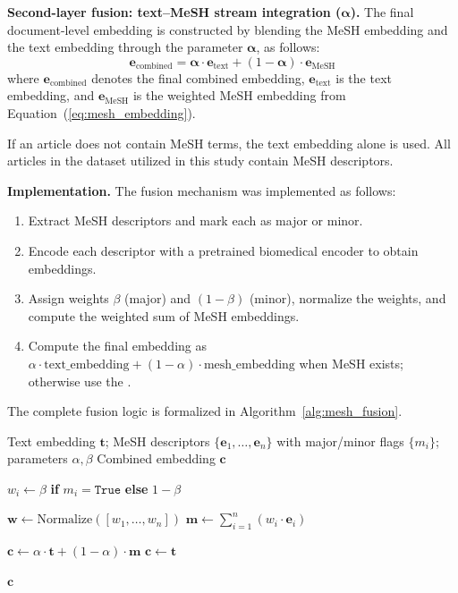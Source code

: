 \documentclass[authorproof,JACIII,researchpaper]{fujipressarticle}
\begin{document}
\noindent\textbf{Second-layer fusion: text--MeSH stream integration ($\boldsymbol{\alpha}$).}
The final document-level embedding is constructed by blending the MeSH embedding and the text embedding through the parameter $\boldsymbol{\alpha}$, as follows:
\begin{equation}
\boldsymbol{e}_{\text{combined}} = \boldsymbol{\alpha} \cdot \boldsymbol{e}_{\text{text}} + (1 - \boldsymbol{\alpha}) \cdot \boldsymbol{e}_{\text{MeSH}}
\label{eq:combined_embedding}
\end{equation}
where $\boldsymbol{e}_{\text{combined}}$ denotes the final combined embedding, $\boldsymbol{e}_{\text{text}}$ is the text embedding, and $\boldsymbol{e}_{\text{MeSH}}$ is the weighted MeSH embedding from Equation~(\ref{eq:mesh_embedding}).

If an article does not contain MeSH terms, the text embedding alone is used.
All articles in the dataset utilized in this study contain MeSH descriptors.

\noindent\textbf{Implementation.}
The fusion mechanism was implemented as follows:
\begin{enumerate}[leftmargin=*,label=\arabic*.]
    \item Extract MeSH descriptors and mark each as major or minor.
    \item Encode each descriptor with a pretrained biomedical encoder to obtain embeddings.
    \item Assign weights $\beta$ (major) and $(1-\beta)$ (minor), normalize the weights, and compute the weighted sum of MeSH embeddings.
    \item Compute the final embedding as $\alpha\cdot\text{text\_embedding} + (1-\alpha)\cdot\text{mesh\_embedding}$ when MeSH exists; otherwise use the .
\end{enumerate}

The complete fusion logic is formalized in Algorithm~\ref{alg:mesh_fusion}.

\begin{algorithm}[H]
\caption{Text--MeSH Fusion with Major/Minor Weights}
\label{alg:mesh_fusion}
\begin{algorithmic}[1]
\Require Text embedding $\boldsymbol{t}$; MeSH descriptors $\{\boldsymbol{e}_1,\ldots,\boldsymbol{e}_n\}$ with major/minor flags $\{m_i\}$; parameters $\alpha,\beta$
\Ensure Combined embedding $\boldsymbol{c}$

    \State $w_i \gets \beta$ \textbf{if} $m_i = \texttt{True}$ \textbf{else} $1-\beta$
\EndFor

\State $\boldsymbol{w} \gets \mathrm{Normalize}([w_1,\ldots,w_n])$
\State $\boldsymbol{m} \gets \sum_{i=1}^{n} (w_i \cdot \boldsymbol{e}_i)$

    \State $\boldsymbol{c} \gets \alpha \cdot \boldsymbol{t} + (1-\alpha) \cdot \boldsymbol{m}$
\Else
    \State $\boldsymbol{c} \gets \boldsymbol{t}$
\EndIf

\State \Return $\boldsymbol{c}$
\end{algorithmic}
\end{algorithm}
\end{document}
